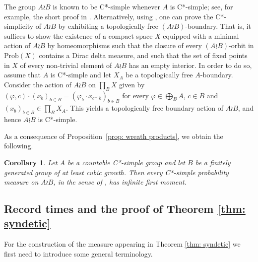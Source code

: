\documentclass[reqno,a4paper,11pt]{amsart}
\numberwithin{equation}{section}
\newcommand{\1}{\mathbf{1}}
\newtheorem{cor}[teo]{Corollary}
\theoremstyle{definition}
\begin{document}
	
	The group $A \wr B$ is known to be C*-simple whenever $A$ is C*-simple; see, for example, the short proof in \cite[Proposition 5.5]{BedosOmland2018}. Alternatively, using \cite[Theorem 1.5]{KalantarKennedy2017}, one can prove the C*-simplicity of $A \wr B$ by exhibiting a topologically free $(A \wr B)$-boundary. That is, it suffices to show the existence of a compact space $X$ equipped with a minimal action of $A \wr B$ by homeomorphisms such that the closure of every $(A \wr B)$-orbit in $\mathrm{Prob}(X)$ contains a Dirac delta measure, and such that the set of fixed points in $X$ of every non-trivial element of $A \wr B$ has an empty interior. In order to do so, assume that $A$ is C*-simple and let $X_A$ be a topologically free $A$-boundary. Consider the action of $A \wr B$ on $\prod_B X$ given by $(\varphi,c)\cdot (x_b)_{b \in B} = (\varphi_b\cdot x_{c^{-1}b})_{b \in B}$ for every $\varphi\in \bigoplus_B A$, $c\in B$ and $(x_b)_{b \in B}\in \prod_B X_A$. This yields a topologically free boundary action of $A \wr B$, and hence $A \wr B$ is C*-simple.
	
	As a consequence of Proposition~\ref{prop: wreath products}, we obtain the following. 
	
	\begin{cor}\label{cor: csimple infinite first moment}
		Let $A$ be a countable C*-simple group and let $B$ be a finitely generated group of at least cubic growth. Then every C*-simple probability measure on $A \wr B$, in the sense of \cite{HartmanKalantar2022}, has infinite first moment.
	\end{cor}
	
	
	
	\subsection{Record times and the proof of Theorem \ref{thm: syndetic}}\label{subsection: proof syndetic}
	
	For the construction of the measure appearing in Theorem \ref{thm: syndetic} we first need to introduce some general terminology.
	
\end{document}
